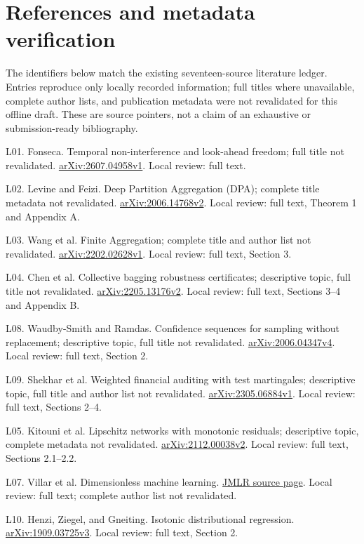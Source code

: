 \documentclass[11pt]{article}
\begin{document}
\section*{References and metadata verification}

The identifiers below match the existing seventeen-source literature ledger. Entries reproduce only locally recorded information; full titles where unavailable, complete author lists, and publication metadata were not revalidated for this offline draft. These are source pointers, not a claim of an exhaustive or submission-ready bibliography.

L01. Fonseca. Temporal non-interference and look-ahead freedom; full title not revalidated. \href{https://arxiv.org/html/2607.04958v1}{arXiv:2607.04958v1}. Local review: full text.

L02. Levine and Feizi. Deep Partition Aggregation (DPA); complete title metadata not revalidated. \href{https://arxiv.org/html/2006.14768v2}{arXiv:2006.14768v2}. Local review: full text, Theorem 1 and Appendix A.

L03. Wang et al. Finite Aggregation; complete title and author list not revalidated. \href{https://arxiv.org/html/2202.02628v1}{arXiv:2202.02628v1}. Local review: full text, Section 3.

L04. Chen et al. Collective bagging robustness certificates; descriptive topic, full title not revalidated. \href{https://arxiv.org/html/2205.13176v2}{arXiv:2205.13176v2}. Local review: full text, Sections 3--4 and Appendix B.

L08. Waudby-Smith and Ramdas. Confidence sequences for sampling without replacement; descriptive topic, full title not revalidated. \href{https://arxiv.org/html/2006.04347v4}{arXiv:2006.04347v4}. Local review: full text, Section 2.

L09. Shekhar et al. Weighted financial auditing with test martingales; descriptive topic, full title and author list not revalidated. \href{https://arxiv.org/html/2305.06884v1}{arXiv:2305.06884v1}. Local review: full text, Sections 2--4.

L05. Kitouni et al. Lipschitz networks with monotonic residuals; descriptive topic, complete metadata not revalidated. \href{https://arxiv.org/html/2112.00038v2}{arXiv:2112.00038v2}. Local review: full text, Sections 2.1--2.2.

L07. Villar et al. Dimensionless machine learning. \href{https://www.jmlr.org/papers/v24/22-0680.html}{JMLR source page}. Local review: full text; complete author list not revalidated.

L10. Henzi, Ziegel, and Gneiting. Isotonic distributional regression. \href{https://arxiv.org/html/1909.03725v3}{arXiv:1909.03725v3}. Local review: full text, Section 2.
\end{document}
